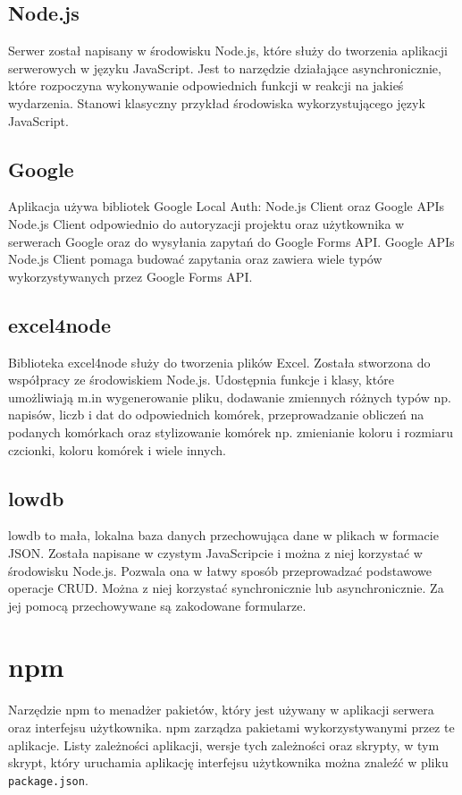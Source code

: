 \subsection{Node.js}
Serwer został napisany w środowisku Node.js\cite{Node.js},
które służy do tworzenia aplikacji
serwerowych w języku JavaScript. Jest to narzędzie działające asynchronicznie, 
które rozpoczyna wykonywanie odpowiednich funkcji w reakcji na jakieś wydarzenia. 
Stanowi klasyczny przykład środowiska wykorzystującego język JavaScript. 

\subsection{Google}
Aplikacja używa bibliotek Google Local Auth: Node.js Client\cite{local-auth-node}
oraz Google APIs Node.js Client\cite{googleapis-forms}
odpowiednio do autoryzacji projektu oraz użytkownika w serwerach Google 
oraz do wysyłania zapytań do Google Forms API. Google APIs Node.js Client 
pomaga budować zapytania oraz zawiera wiele typów wykorzystywanych przez
Google Forms API.

\subsection{excel4node}
Biblioteka excel4node\cite{excelfornode} służy do tworzenia plików Excel.
Została stworzona do współpracy ze środowiskiem Node.js. Udostępnia funkcje
i klasy, które umożliwiają m.in wygenerowanie pliku, dodawanie zmiennych różnych
typów np. napisów, liczb i dat do odpowiednich komórek, przeprowadzanie obliczeń na
podanych komórkach oraz stylizowanie komórek np. zmienianie koloru i rozmiaru
czcionki, koloru komórek i wiele innych.

\subsection{lowdb}
lowdb\cite{lowdb} to mała, lokalna baza danych przechowująca dane w plikach
w formacie JSON.
Została napisane w czystym JavaScripcie i można z niej korzystać w środowisku 
Node.js. Pozwala ona w łatwy sposób przeprowadzać podstawowe operacje CRUD.
Można z niej korzystać synchronicznie lub asynchronicznie.
Za jej pomocą przechowywane są zakodowane formularze. 

\section{npm}
Narzędzie npm\cite{npm} to menadżer pakietów, który jest używany w aplikacji serwera oraz interfejsu użytkownika.
npm zarządza pakietami wykorzystywanymi przez te aplikacje. Listy zależności aplikacji, 
wersje tych zależności
oraz skrypty, w tym skrypt, który uruchamia aplikację interfejsu użytkownika można znaleźć
w pliku \texttt{package.json}.

